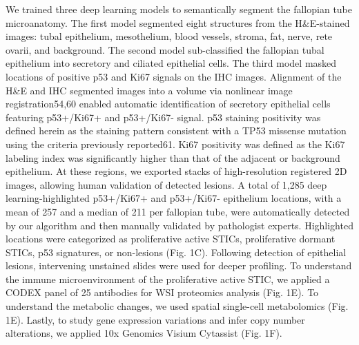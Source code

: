 \begin{refsection}
    We trained three deep learning models to semantically segment the fallopian tube microanatomy. The first model segmented eight structures from the H&E-stained images: tubal epithelium, mesothelium, blood vessels, stroma, fat, nerve, rete ovarii, and background. The second model sub-classified the fallopian tubal epithelium into secretory and ciliated epithelial cells. The third model masked locations of positive p53 and Ki67 signals on the IHC images. Alignment of the H\&E and IHC segmented images into a volume via nonlinear image registration54,60 enabled automatic identification of secretory epithelial cells featuring p53+/Ki67+ and p53+/Ki67- signal. p53 staining positivity was defined herein as the staining pattern consistent with a TP53 missense mutation using the criteria previously reported61. Ki67 positivity was defined as the Ki67 labeling index was significantly higher than that of the adjacent or background epithelium. At these regions, we exported stacks of high-resolution registered 2D images, allowing human validation of detected lesions. A total of 1,285 deep learning-highlighted p53+/Ki67+ and p53+/Ki67- epithelium locations, with a mean of 257 and a median of 211 per fallopian tube, were automatically detected by our algorithm and then manually validated by pathologist experts. Highlighted locations were categorized as proliferative active STICs, proliferative dormant STICs, p53 signatures, or non-lesions (Fig. 1C). 
    Following detection of epithelial lesions, intervening unstained slides were used for deeper profiling. To understand the immune microenvironment of the proliferative active STIC, we applied a CODEX panel of 25 antibodies for WSI proteomics analysis (Fig. 1E). To understand the metabolic changes, we used spatial single-cell metabolomics (Fig. 1E). Lastly, to study gene expression variations and infer copy number alterations, we applied 10x Genomics Visium Cytassist (Fig. 1F).
    

\end{refsection}
